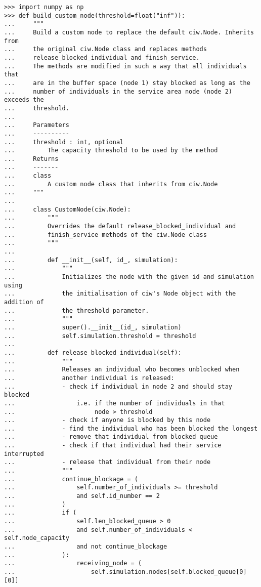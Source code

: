 \begin{lstlisting}[style=pystyle]
>>> import numpy as np
>>> def build_custom_node(threshold=float("inf")):
...     """
...     Build a custom node to replace the default ciw.Node. Inherits from
...     the original ciw.Node class and replaces methods
...     release_blocked_individual and finish_service.
...     The methods are modified in such a way that all individuals that
...     are in the buffer space (node 1) stay blocked as long as the
...     number of individuals in the service area node (node 2) exceeds the
...     threshold.
...
...     Parameters
...     ----------
...     threshold : int, optional
...         The capacity threshold to be used by the method
...     Returns
...     -------
...     class
...         A custom node class that inherits from ciw.Node
...     """
...
...     class CustomNode(ciw.Node):
...         """
...         Overrides the default release_blocked_individual and
...         finish_service methods of the ciw.Node class
...         """
...
...         def __init__(self, id_, simulation):
...             """
...             Initializes the node with the given id and simulation using
...             the initialisation of ciw's Node object with the addition of
...             the threshold parameter.
...             """
...             super().__init__(id_, simulation)
...             self.simulation.threshold = threshold
...
...         def release_blocked_individual(self):
...             """
...             Releases an individual who becomes unblocked when
...             another individual is released:
...             - check if individual in node 2 and should stay blocked
...                 i.e. if the number of individuals in that
...                      node > threshold
...             - check if anyone is blocked by this node
...             - find the individual who has been blocked the longest
...             - remove that individual from blocked queue
...             - check if that individual had their service interrupted
...             - release that individual from their node
...             """
...             continue_blockage = (
...                 self.number_of_individuals >= threshold
...                 and self.id_number == 2
...             )
...             if (
...                 self.len_blocked_queue > 0
...                 and self.number_of_individuals < self.node_capacity
...                 and not continue_blockage
...             ):
...                 receiving_node = (
...                     self.simulation.nodes[self.blocked_queue[0][0]]

\end{lstlisting}
